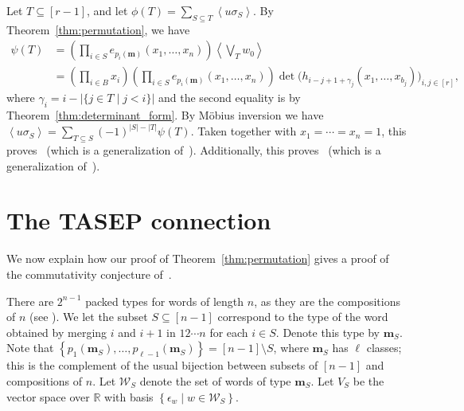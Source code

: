 \documentclass[reqno]{amsart}
\newcommand{\0}{\phantom{c}}
\newcommand{\swt}[1]{\left\langle #1 \right\rangle} %
\newcommand{\mm}{\mathbf{m}}
\newcommand{\mcW}{\mathcal{W}}
\newcommand{\RR}{\mathbb{R}}
\let\sumnonlimits\sum
\let\prodnonlimits\prod
\renewcommand{\sum}{\sumnonlimits\limits}
\renewcommand{\prod}{\prodnonlimits\limits}
\newcommand{\set}[1]{\left\{ #1 \right\}}
\newcommand{\ive}[1]{\left[ #1 \right]}
\theoremstyle{plain}
\theoremstyle{definition}
\numberwithin{equation}{section}
\begin{document}
Let $T \subseteq \ive{r-1}$, and let $\phi(T) = \sum_{S \subseteq T} \swt{u \sigma_S}$.
By Theorem~\ref{thm:permutation}, we have
\begin{align*}
  \psi(T) & = \left(\prod_{i\in S} e_{p_i(\mm)}(x_1, \dotsc, x_n) \right) \swt{ \bigvee_T w_0}
  \\ & = \left( \prod_{i\in B} x_i \right) \left(\prod_{i\in S} e_{p_i(\mm)}(x_1, \dotsc, x_n) \right) \det\bigl(h_{i-j+1+\gamma_j}(x_1, \dotsc, x_{b_j})\bigr)_{i, j \in \ive{r}},
\end{align*}
where $\gamma_i = i - \lvert \{j\in T \mid j < i \} \rvert$ and the second equality is by Theorem~\ref{thm:determinant_form}.
By M\"obius inversion we have $\swt{u \sigma_S} = \sum_{T\subseteq S} (-1)^{|S|-|T|} \psi(T)$.
Taken together with $x_1 = \cdots = x_n = 1$, this proves~\cite[Conj.~3.10]{AasLin17} (which is a generalization of~\cite[Conj.~3.9]{AasLin17}).
Additionally, this proves~\cite[Conj.~3.6]{AasLin17} (which is a generalization of~\cite[Conj.~3.4]{AasLin17}).










\section{The TASEP connection}
\label{sec:tasep}

We now explain how our proof of Theorem~\ref{thm:permutation} gives a proof of the commutativity conjecture of~\cite{AAMP}.

There are $2^{n-1}$ packed types for words of length $n$, as they are the compositions of $n$ (see \cite[Section 1.2]{Stanley-EC1}).
We let the subset $S \subseteq [n-1]$ correspond to the type of the word obtained by merging $i$ and $i+1$ in $12 \dotsm n$ for each $i \in S$.
Denote this type by $\mm_S$.
Note that $\set{p_1(\mm_S), \dotsc, p_{\ell-1}(\mm_S)} = [n-1] \setminus S$, where $\mm_S$ has $\ell$ classes; this is the complement of the usual bijection between subsets of $\ive{n-1}$ and compositions of $n$.
Let $\mcW_S$ denote the set of words of type $\mm_S$.
Let $V_S$ be the vector space over $\RR$ with basis $\set{\epsilon_w \mid w \in \mcW_S}$.
\end{document}
